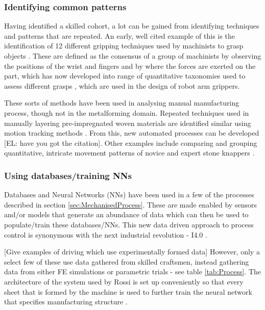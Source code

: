 \subsubsection{Identifying common patterns}
Having identified a skilled cohort, a lot can be gained from identifying techniques and patterns that are repeated. An early, well cited example of this is the identification of 12 different gripping techniques used by machinists to grasp objects \citep{cutkosky1986modeling}. These are defined as the consensus of a group of machinists by observing the positions of the wrist and fingers and by where the forces are exerted on the part, which has now developed into range of quantitative taxonomies used to assess different grasps \citep{Feix2016}, which are used in the design of robot arm grippers.

These sorts of methods have been used in analysing manual manufacturing process, though not in the metalforming domain. Repeated techniques used in manually layering pre-impregnated woven materials are identified similar using motion tracking methods \citep{Kikuchi2014, Elkington2015}. From this, new automated processes can be developed [EL: have you got the citation]. Other examples include comparing and grouping quantitative, intricate movement patterns of novice and expert stone knappers \citep{Rein2014}.  

\subsubsection{Using databases/training NNs}
Databases and Neural Networks (NNs) have been used in a few of the processes described in section \ref{sec:MechanisedProcess}. These are made enabled by sensors and/or models that generate an abundance of data which can then be used to populate/train these databases/NNs. This new data driven approach to process control is synonymous with the next industrial revolution - I4.0 \citep{ZHONG2017616}. %

[Give examples of driving which use experimentally formed data]
However, only a select few of these use data gathered from skilled craftsmen, instead gathering data from either FE simulations or parametric trials  - see table \ref{tab:Process}.
The architecture of the system used by Rossi is set up conveniently so that every sheet that is formed by the machine is used to further train the neural network that specifies manufacturing structure \citep{Rossi2018a}.

